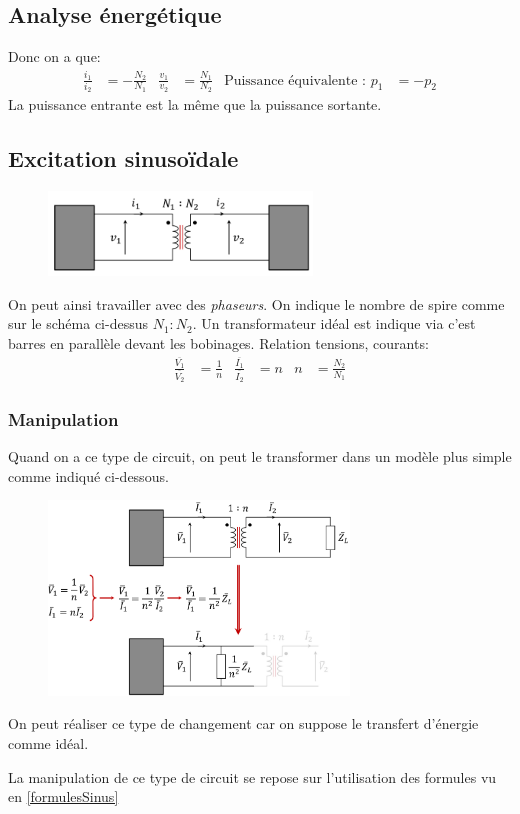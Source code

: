 \documentclass{report}
\begin{document}
\subsection{Analyse énergétique}
Donc on a que:
\begin{align*}
\frac{i_1}{i_2} &= - \frac{N_2}{N_1} &  \frac{v_1}{v_2} &=  \frac{N_1}{N_2} & \text{Puissance équivalente : } p_1 &= -p_2
\end{align*}
La puissance entrante est la même que la puissance sortante.

\subsection{Excitation sinusoïdale}
\begin{figure}[H]
\centering
\includegraphics[width=7cm]{img/transSinus.png}
\end{figure}
On peut ainsi travailler avec des \textit{phaseurs}. On indique le nombre de spire comme sur le schéma ci-dessus $N_1 : N_2$. Un transformateur idéal est indique via c'est barres en parallèle devant les bobinages. Relation tensions, courants:
\begin{align*}
\frac{\overline{V_1}}{\overline{V_2}} &= \frac{1}{n} & \frac{\overline{I_1}}{\overline{I_2}} &= n & n &= \frac{N_2}{N_1}
\label{formulesSinus}
\end{align*}

\subsubsection{Manipulation}
Quand on a ce type de circuit, on peut le transformer dans un modèle plus simple comme indiqué ci-dessous.
\begin{figure}[H]
\centering
\includegraphics[width=8cm]{img/manipTrans.png}
\end{figure}
On peut réaliser ce type de changement car on suppose le transfert d'énergie comme idéal.\par
La manipulation de ce type de circuit se repose sur l'utilisation des formules vu en \ref{formulesSinus}
\end{document}
